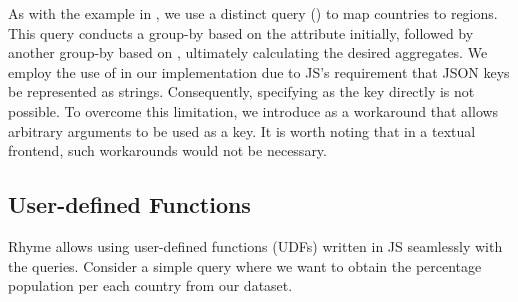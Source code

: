 \documentclass[runningheads]{llncs}
\newcommand{\lang}{Rhyme}
\begin{document}
As with the example in , we use a distinct query
() to map countries to regions.
This query conducts a group-by based on the  attribute initially,
followed by another group-by based on , ultimately calculating the
desired aggregates.
 We employ the use of  in our implementation due to JS's requirement that JSON
keys be represented as strings.
Consequently, specifying  as the key directly
is not possible.
To overcome this limitation, we introduce  as a workaround that allows arbitrary
arguments to be used as a key.
It is worth noting that in a textual frontend, such workarounds would not be necessary.






\subsection{User-defined Functions}
\lang{} allows using user-defined functions (UDFs) written in JS seamlessly with the
queries.
Consider a simple query where we want to obtain the percentage population per each
country from our dataset.
\end{document}

